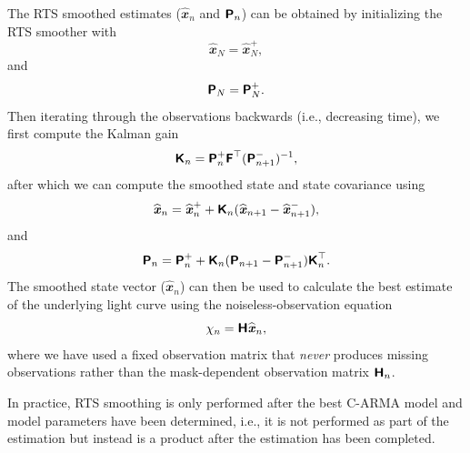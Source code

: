 \documentclass[a4paper,fleqn,usenatbib]{mnras}
\begin{document}
The RTS smoothed estimates ($\widehat{\mathbfit{x}}_{n}$ and $\textbf{\textsf{P}}_{n}$) can be obtained by initializing the RTS smoother with
\begin{equation}\label{eq:xRTSInit}
\widehat{\mathbfit{x}}_{N} = \widehat{\mathbfit{x}}^{+}_{N},
\end{equation}
and
\begin{equation}\label{eq:PRTSInit}
\textbf{\textsf{P}}_{N} = \textbf{\textsf{P}}^{+}_{N}.
\end{equation}
Then iterating through the observations backwards (i.e., decreasing time), we first compute the Kalman gain
\begin{equation}\label{eq:KalmanRTS}
\textbf{\textsf{K}}_{n} = \textbf{\textsf{P}}^{+}_{n} \textbf{\textsf{F}}^{\top} (\textbf{\textsf{P}}^{-}_{n+1})^{-1},
\end{equation}
after which we can compute the smoothed state and state covariance using
\begin{equation}\label{eq:xRTS}
\widehat{\textbf{\textit{x}}}_{n} = \widehat{\textbf{\textit{x}}}^{+}_{n} + \textbf{\textsf{K}}_{n} (\widehat{\textbf{\textit{x}}}_{n+1} - \widehat{\textbf{\textit{x}}}^{-}_{n+1}),
\end{equation}
and
\begin{equation}\label{eq:PRTS}
\textbf{\textsf{P}}_{n} = \textbf{\textsf{P}}^{+}_{n} + \textbf{\textsf{K}}_{n} (\textbf{\textsf{P}}_{n+1} - \textbf{\textsf{P}}^{-}_{n+1}) \textbf{\textsf{K}}_{n}^{\top}.
\end{equation}
The smoothed state vector ($\widehat{\mathbfit{x}}_{n}$) can then be used to calculate the best estimate of the underlying light curve using the noiseless-observation equation
\begin{equation}\label{eq:NoiselessObsEq}
\chi_{n} = \textbf{\textsf{H}} \widehat{\textbf{\textit{x}}}_{n},
\end{equation}
where we have used a fixed observation matrix that \textit{never} produces missing observations rather than the mask-dependent observation matrix $\textbf{\textsf{H}}_{n}$.

In practice, RTS smoothing is only performed after the best C-ARMA model and model parameters have been determined, i.e., it is not performed as part of the estimation but instead is a product after the estimation has been completed.

\end{document}
